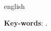 \begin{resumo}[Abstract]			%
\begin{otherlanguage*}{english}		%



\vspace{\onelineskip}
\noindent
\textbf{Key-words}: .
\end{otherlanguage*}
\end{resumo}

% 

%  
